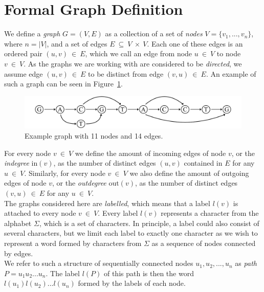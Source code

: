 \documentclass[a4paper,12pt,twoside,BCOR=10mm]{scrbook}
\begin{document}
\section{Formal Graph Definition}
\label{sec:graph_definition}
%
We define a \textit{graph} $ G = (V, E) $ as a collection of a set
of \textit{nodes} $ V = \{ v_1, ..., v_n \} $, where $ n = |V| $, and a set of edges $ E {\: \subseteq \:} V {\: \times \:} V $.
Each one of these edges is an ordered pair $ (u, v) {\: \in \:} E $,
which we call an edge from node $ u {\: \in \:} V $ to node $ v {\: \in \:} V $.
As the graphs we are working with are considered to be \textit{directed},
we assume edge $ (u, v) {\: \in \:} E $ to
be distinct from edge $ (v, u) {\: \in \:} E $.
An example of such a graph can be seen in Figure~\ref{fig:evo_fig_graph_example}.

\begin{figure}[!htb]
\centering
\includegraphics[width=\textwidth]{evo_fig_graph_example.pdf}
\caption[Example graph]{Example graph with 11 nodes and 14 edges.} \label{fig:evo_fig_graph_example}
\end{figure}

For every node $ v {\: \in \:} V $ we define the amount of incoming edges of
node $ v $, or the \textit{indegree} $ \textrm{in} ( v ) $, as the number of
distinct edges $ (u, v) $ contained in $ E $ for any $ u {\: \in \:} V $.
Similarly, for every node $ v {\: \in \:} V $ we also define the amount of outgoing edges of
node $ v $, or the \textit{outdegree} $ \textrm{out} ( v ) $, as the number of
distinct edges $ (v, u) {\: \in \:} E $ for any $ u {\: \in \:} V $. \\
The graphs considered here are \textit{labelled}, which means that a label $ l( v ) $ is attached
to every node $ v {\: \in \:} V $.
Every label $ l( v ) $ represents a character
from the alphabet $ \Sigma $, which is a set of characters.
In principle, a label could also consist of several characters,
but we limit each label to exactly one character as we wish to
represent a word formed by characters from $ \Sigma $ as a sequence of nodes
connected by edges. \\
We refer to such a structure of sequentially connected
nodes $ u_1, u_2, ..., u_n $ as \textit{path} $ P = u_1 u_2 ... u_n $.
The label $ l ( P ) $ of this path is then the word $ l ( u_1 ) l( u_2 ) ... l ( u_n ) $ formed by the labels of each node.
\end{document}
